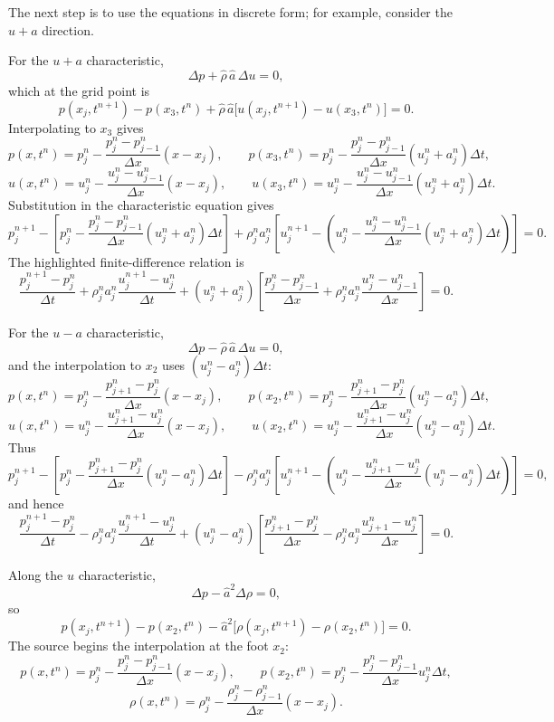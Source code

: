 \documentclass[11pt]{article}
\begin{document}
The next step is to use the equations in discrete form; for example, consider
the \(u+a\) direction.

For the \(u+a\) characteristic,
\[
\Delta p+\widehat\rho\,\widehat a\,\Delta u=0,
\]
which at the grid point is
\[
p(x_j,t^{n+1})-p(x_3,t^n)
+\widehat\rho\,\widehat a
\bigl[u(x_j,t^{n+1})-u(x_3,t^n)\bigr]=0.
\]
Interpolating to \(x_3\) gives
\[
p(x,t^n)=p_j^n-
\frac{p_j^n-p_{j-1}^n}{\Delta x}(x-x_j),
\qquad
p(x_3,t^n)
=p_j^n-\frac{p_j^n-p_{j-1}^n}{\Delta x}
(u_j^n+a_j^n)\Delta t,
\]
\[
u(x,t^n)=u_j^n-
\frac{u_j^n-u_{j-1}^n}{\Delta x}(x-x_j),
\qquad
u(x_3,t^n)
=u_j^n-\frac{u_j^n-u_{j-1}^n}{\Delta x}
(u_j^n+a_j^n)\Delta t.
\]
Substitution in the characteristic equation gives
\[
p_j^{n+1}-\left[p_j^n-
\frac{p_j^n-p_{j-1}^n}{\Delta x}(u_j^n+a_j^n)\Delta t\right]
+\rho_j^n a_j^n\left[u_j^{n+1}-\left(u_j^n-
\frac{u_j^n-u_{j-1}^n}{\Delta x}(u_j^n+a_j^n)\Delta t\right)\right]=0.
\]
The highlighted finite-difference relation is
\[
\frac{p_j^{n+1}-p_j^n}{\Delta t}
+\rho_j^n a_j^n\frac{u_j^{n+1}-u_j^n}{\Delta t}
+(u_j^n+a_j^n)
\left[
\frac{p_j^n-p_{j-1}^n}{\Delta x}
+\rho_j^n a_j^n\frac{u_j^n-u_{j-1}^n}{\Delta x}
\right]=0.
\]

For the \(u-a\) characteristic,
\[
\Delta p-\widehat\rho\,\widehat a\,\Delta u=0,
\]
and the interpolation to \(x_2\) uses
\((u_j^n-a_j^n)\Delta t\):
\[
p(x,t^n)=p_j^n-
\frac{p_{j+1}^n-p_j^n}{\Delta x}(x-x_j),
\qquad
p(x_2,t^n)=p_j^n-
\frac{p_{j+1}^n-p_j^n}{\Delta x}(u_j^n-a_j^n)\Delta t,
\]
\[
u(x,t^n)=u_j^n-
\frac{u_{j+1}^n-u_j^n}{\Delta x}(x-x_j),
\qquad
u(x_2,t^n)=u_j^n-
\frac{u_{j+1}^n-u_j^n}{\Delta x}(u_j^n-a_j^n)\Delta t.
\]
Thus
\[
p_j^{n+1}-\left[p_j^n-
\frac{p_{j+1}^n-p_j^n}{\Delta x}(u_j^n-a_j^n)\Delta t\right]
-\rho_j^n a_j^n\left[u_j^{n+1}-\left(u_j^n-
\frac{u_{j+1}^n-u_j^n}{\Delta x}(u_j^n-a_j^n)\Delta t\right)\right]=0,
\]
and hence
\[
\frac{p_j^{n+1}-p_j^n}{\Delta t}
-\rho_j^n a_j^n\frac{u_j^{n+1}-u_j^n}{\Delta t}
+(u_j^n-a_j^n)
\left[
\frac{p_{j+1}^n-p_j^n}{\Delta x}
-\rho_j^n a_j^n\frac{u_{j+1}^n-u_j^n}{\Delta x}
\right]=0.
\]

Along the \(u\) characteristic,
\[
\Delta p-\widehat a^2\Delta\rho=0,
\]
so
\[
p(x_j,t^{n+1})-p(x_2,t^n)
-\widehat a^2\bigl[\rho(x_j,t^{n+1})-\rho(x_2,t^n)\bigr]=0.
\]
The source begins the interpolation at the foot \(x_2\):
\[
p(x,t^n)=p_j^n-\frac{p_j^n-p_{j-1}^n}{\Delta x}(x-x_j),
\qquad
p(x_2,t^n)=p_j^n-\frac{p_j^n-p_{j-1}^n}{\Delta x}u_j^n\Delta t,
\]
\[
\rho(x,t^n)=\rho_j^n-\frac{\rho_j^n-\rho_{j-1}^n}{\Delta x}(x-x_j).
\]
\end{document}
